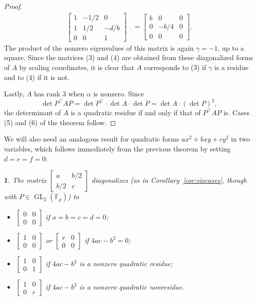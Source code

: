 \documentclass[10pt,a4paper]{amsart}
\numberwithin{equation}{section}
\numberwithin{figure}{section}
\theoremstyle{definition}
\theoremstyle{remark}
\theoremstyle{plain}
\theoremstyle{plain}
\newtheorem{cor}{\protect\corollaryname}[section]
\theoremstyle{definition}
\theoremstyle{plain}
\theoremstyle{plain}
\providecommand{\corollaryname}{Corollary}
\newcommand{\F}{\mathbb{F}}
\newcommand{\GL}{\operatorname{GL}}
\begin{document}
\begin{proof}
\begin{align*}
\begin{bmatrix}
			1 & -1/2 & 0\\
			1 & 1/2 & -d/b\\
			0 & 0 & 1
		\end{bmatrix}
		&=
		\begin{bmatrix}
			b&0&0\\
			0&-b/4&0\\
			0&0&0
		\end{bmatrix}.
	\end{align*}
	The product of the nonzero eigenvalues of this matrix is again $\gamma=-1$, up to a square. Since the matrices (3) and (4) are obtained from these diagonalized forms of $A$ by scaling coordinates, it is clear that $A$ corresponds to (3) if $\gamma$ is a residue and to (4) if it is not.
	
	Lastly, $A$ has rank $3$ when $\alpha$ is nonzero. Since
	\begin{equation*}
	\det P^\top AP=\det P^\top \cdot\det A\cdot\det P=\det A\cdot(\det P)^2,
	\end{equation*}
	the determinant of $A$ is a quadratic residue if and only if that of $P^\top AP$ is. Cases (5) and (6) of the theorem follow.
	\end{proof}
	
	We will also need an analogous result for quadratic forms $ax^2+bxy+cy^2$ in two variables, which follows immediately from the previous theorem by setting $d=e=f=0$:
	\begin{cor}\label{cor:diag-P1}
	The matrix $\left[\begin{smallmatrix}a&b/2\\b/2&c\end{smallmatrix}\right]$ diagonalizes (as in Corollary~\ref{cor:sixcases}, though with $P \in \GL_2(\F_p)$) to
	\begin{itemize}
	\item $\left[\begin{smallmatrix}0&0\\0&0\end{smallmatrix}\right]$ if $a=b=c=d=0$;
	\item $\left[\begin{smallmatrix}1&0\\0&0\end{smallmatrix}\right]$ or $\left[\begin{smallmatrix}r&0\\0&0\end{smallmatrix}\right]$ if $4ac-b^2=0$;
	\item $\left[\begin{smallmatrix}1&0\\0&1\end{smallmatrix}\right]$ if $4ac-b^2$ is a nonzero quadratic residue;
	\item $\left[\begin{smallmatrix}1&0\\0&r\end{smallmatrix}\right]$ if $4ac-b^2$ is a nonzero quadratic nonresidue.
	\end{itemize}
	\end{cor}
	
\end{document}
